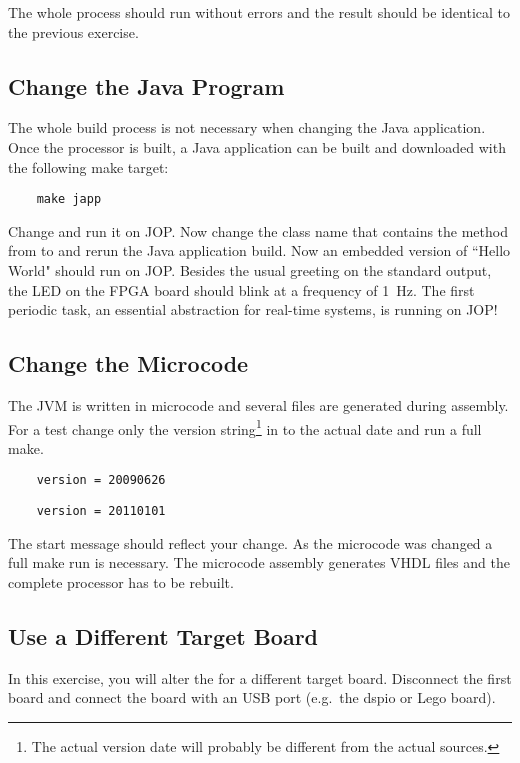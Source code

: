The whole process should run without errors and the result should be
identical to the previous exercise.

\subsection{Change the Java Program}

The whole build process is not necessary when changing the Java
application. Once the processor is built, a Java application can be
built and downloaded with the following make target:
\begin{lstlisting}
    make japp
\end{lstlisting}
Change  and run it on JOP. Now change the class
name that contains the  method from  to
 and rerun the Java application build. Now an embedded
version of ``Hello World" should run on JOP. Besides the usual
greeting on the standard output, the LED on the FPGA board should
blink at a frequency of 1~Hz. The first periodic task, an essential
abstraction for real-time systems, is running on JOP!

\subsection{Change the Microcode}

The JVM is written in microcode and several  files are
generated during assembly. For a test change only the version
string\footnote{The actual version date will probably be different
from the actual sources.} in  to the actual date and
run a full make.
\begin{lstlisting}
    version = 20090626
\end{lstlisting}
\begin{lstlisting}
    version = 20110101
\end{lstlisting}
The start message should reflect your change. As the microcode was
changed a full make run is necessary. The microcode assembly
generates VHDL files and the complete processor has to be rebuilt.


\subsection{Use a Different Target Board}

In this exercise, you will alter the  for a different
target board. Disconnect the first board and connect the board with
an USB port (e.g.\ the dspio or Lego board).

